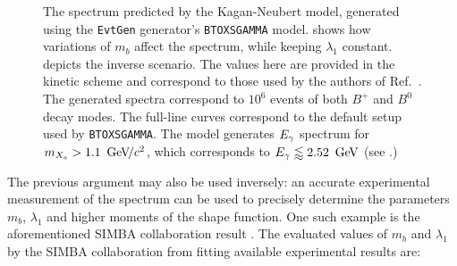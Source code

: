 \begin{figure}[htbp!]
    \caption{\label{fig:knmodel_variation}The \BtoXsgamma spectrum predicted by the Kagan-Neubert model, generated using the \texttt{EvtGen} generator's \texttt{BTOXSGAMMA} model.
     shows how variations of $m_b$ affect the spectrum, while keeping $\lambda_1$ constant.
     depicts the inverse scenario.
    The values here are provided in the kinetic scheme and correspond to those used by the authors of Ref.~\cite{Kagan:1998ym}.
    The generated spectra correspond to $10^6$ events of both $B^+$ and $B^0$ decay modes.
    The full-line curves correspond to the default setup used by \texttt{BTOXSGAMMA}.
    The model generates ${E_{\gamma}}$ spectrum for $m_{X_s}>1.1~{\mathrm{\,Ge\kern -0.1em V\!/}c^2}$, which corresponds to ${E_{\gamma}}\lessapprox2.52~\mathrm{\,Ge\kern -0.1em V}$ (see .)}
\end{figure}


The previous argument may also be used inversely: an accurate experimental measurement of the \BtoXsgamma spectrum
can be used to precisely determine the parameters $m_b$, $\lambda_1$ and higher moments of the shape function.
One such example is the aforementioned SIMBA collaboration result \cite{Bernlochner:2020jlt}.
The evaluated values of $m_b$ and $\lambda_1$ by the SIMBA collaboration from fitting available \BtoXsgamma experimental results are:

